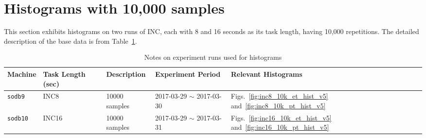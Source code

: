 \section{Histograms with 10,000 samples~\label{sec:sodb9_10k_hist}} 
This section exhibits histograms on two runs of 
INC, each with 8 and 16 seconds as its task length, having 10,000 repetitions.
The detailed description of the base data is from Table~\ref{tab:exp_notes3}.

\begin{table}[h]
\begin{center}
\begin{tabular}{|p{2cm}|p{3cm}|p{3cm}|p{4cm}|p{3.5cm}|} \hline
Machine & Task Length (sec) & Description & Experiment Period & Relevant \linebreak Histograms\\ \hline
{\tt sodb9} &  INC8 & 10000 samples & 2017-03-29 $\sim$ 2017-03-30 & Figs.~\ref{fig:inc8_10k_et_hist_v5} and~\ref{fig:inc8_10k_pt_hist_v5}\\ \hline
{\tt sodb10} &  INC16 & 10000 samples & 2017-03-29 $\sim$ 2017-03-31 & 
Figs.~\ref{fig:inc16_10k_et_hist_v5} and~\ref{fig:inc16_10k_pt_hist_v5}\\ \hline
\end{tabular}
\end{center}
\vspace{-.2in}
\caption{Notes on experiment runs used for histograms\label{tab:exp_notes3}}
\end{table}

